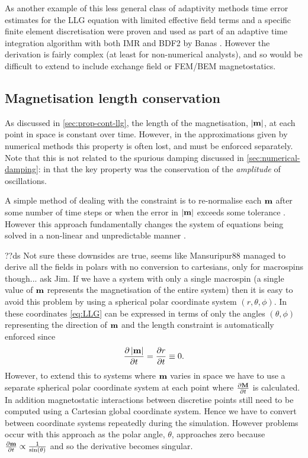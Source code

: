 As another example of this less general class of adaptivity methods time error estimates for the LLG equation with limited effective field terms and a specific finite element discretisation were proven and used as part of an adaptive time integration algorithm with both IMR and BDF2 by Banas \cite{Banas-thesis}.
However the derivation is fairly complex (at least for non-numerical analysts), and so would be difficult to extend to include exchange field or FEM/BEM magnetostatics.


\subsection{Magnetisation length conservation}
\label{sec:ensuring-constant-mv}

As discussed in \cref{sec:prop-cont-llg}, the length of the magnetisation, $\left|{\boldsymbol{\mathrm{m}}} \right|$, at each point in space is constant over time.
However, in the approximations given by numerical methods this property is often lost, and must be enforced separately.
Note that this is not related to the spurious damping discussed in \cref{sec:numerical-damping}: in that  the key property was the conservation of the \emph{amplitude} of oscillations.

A simple method of dealing with the constraint is to re-normalise each $\boldsymbol{\mathrm{m}}$ after some number of time steps or when the error in $\left|{\boldsymbol{\mathrm{m}}} \right|$ exceeds some tolerance \cite{Fidler2000}.
However this approach fundamentally changes the system of equations being solved in a non-linear and unpredictable manner \cite{Lewis2003}.

??ds Not sure these downsides are true, seems like Mansuripur88 managed to derive all the fields in polars with no conversion to cartesians, only for macrospins though... ask Jim.
If we have a system with only a single macrospin (\ie a single value of $\boldsymbol{\mathrm{m}}$ represents the magnetisation of the entire system) then it is easy to avoid this problem by using a spherical polar coordinate system $(r,\theta,\phi)$.
In these coordinates \cref{eq:LLG} can be expressed in terms of only the angles $(\theta,\phi)$ representing the direction of $\boldsymbol{\mathrm{m}}$ and the length constraint is automatically enforced since
\begin{equation}
  \label{eq:40}
  \frac{\partial \left|{\boldsymbol{\mathrm{m}}} \right|}{\partial t} = \frac{\partial r}{\partial t} \equiv 0.
\end{equation}
However, to extend this to systems where $\boldsymbol{\mathrm{m}}$ varies in space we have to use a separate spherical polar coordinate system at each point where $\frac{\partial \boldsymbol{\mathrm{M}}}{\partial t}$ is calculated.
In addition magnetostatic interactions between discretise points still need to be computed using a Cartesian global coordinate system.
Hence we have to convert between coordinate systems repeatedly during the simulation.
However problems occur with this approach as the polar angle, $\theta$, approaches zero because $\frac{\partial \boldsymbol{\mathrm{m}}}{\partial t} \propto \frac{1}{\sin(\theta)}$ \cite{Fukushima2005} and so the derivative becomes singular.

